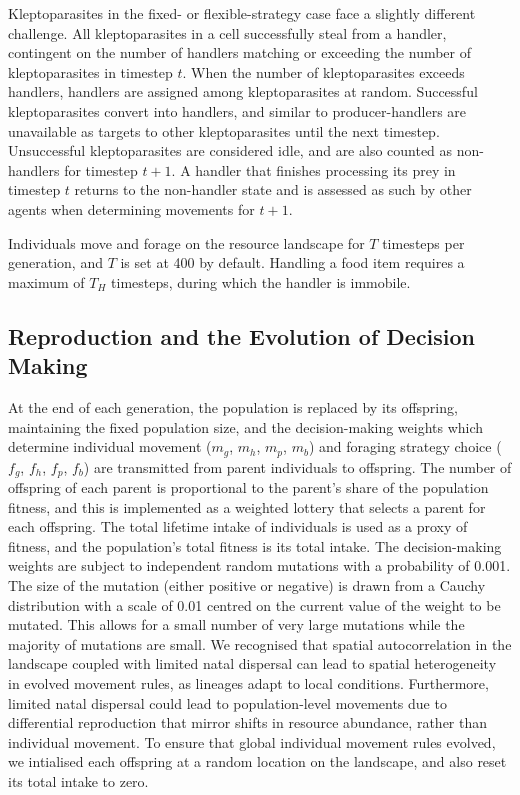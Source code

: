 \documentclass[11pt]{article}
\begin{document}
Kleptoparasites in the fixed- or flexible-strategy case face a slightly different challenge.
All kleptoparasites in a cell successfully steal from a handler, contingent on the number of handlers matching or exceeding the number of kleptoparasites in timestep $t$.
When the number of kleptoparasites exceeds handlers, handlers are assigned among kleptoparasites at random.
Successful kleptoparasites convert into handlers, and similar to producer-handlers are unavailable as targets to other kleptoparasites until the next timestep.
Unsuccessful kleptoparasites are considered idle, and are also counted as non-handlers for timestep $t+1$.
A handler that finishes processing its prey in timestep $t$ returns to the non-handler state and is assessed as such by other agents when determining movements for $t+1$.

Individuals move and forage on the resource landscape for $T$ timesteps per generation, and $T$ is set at 400 by default.
Handling a food item requires a maximum of $T_H$ timesteps, during which the handler is immobile.

\subsection*{Reproduction and the Evolution of Decision Making}

At the end of each generation, the population is replaced by its offspring, maintaining the fixed population size, and the decision-making weights which determine individual movement ($m_g$, $m_h$, $m_p$, $m_b$) and foraging strategy choice ($f_g$, $f_h$, $f_p$, $f_b$) are transmitted from parent individuals to offspring.
The number of offspring of each parent is proportional to the parent's share of the population fitness, and this is implemented as a weighted lottery that selects a parent for each offspring.
The total lifetime intake of individuals is used as a proxy of fitness, and the population's total fitness is its total intake.
The decision-making weights are subject to independent random mutations with a probability of 0.001.
The size of the mutation (either positive or negative) is drawn from a Cauchy distribution with a scale of 0.01 centred on the current value of the weight to be mutated.
This allows for a small number of very large mutations while the majority of mutations are small.
We recognised that spatial autocorrelation in the landscape coupled with limited natal dispersal can lead to spatial heterogeneity in evolved movement rules, as lineages adapt to local conditions.
Furthermore, limited natal dispersal could lead to population-level movements due to differential reproduction that mirror shifts in resource abundance, rather than individual movement.
To ensure that global individual movement rules evolved, we intialised each offspring at a random location on the landscape, and also reset its total intake to zero.
\end{document}
